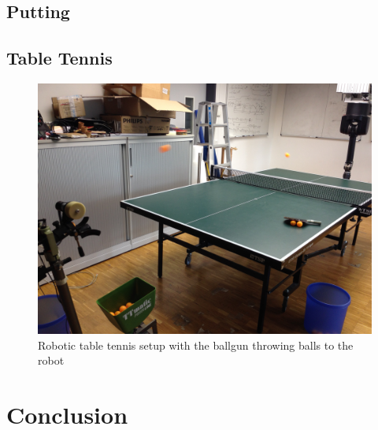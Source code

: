 \documentclass[10pt,a4paper]{article}
\begin{document}
\subsection{Putting}

\subsection{Table Tennis}

\begin{figure}
\center
\includegraphics[scale=0.05, angle= 180]{ballgun.jpg}			
\caption{Robotic table tennis setup with the ballgun throwing balls to the robot}
\end{figure}

\section{Conclusion}\label{conclusion}


%
%

\end{document}
